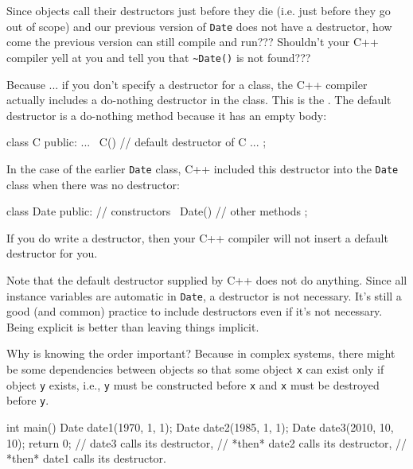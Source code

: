 \newpage{}

Since objects call their destructors just before they die (i.e. just
before they go out of scope) and our previous version of \texttt{Date}
does not have a destructor, how come the previous version can still
compile and run??? Shouldn't your C++ compiler yell at
you and tell you that \texttt{\~{}Date()} is not found???


Because ... if you don't specify a destructor for a
class, the C++ compiler actually includes a do-nothing destructor in the
class. This is the . The default destructor
is a do-nothing method because it has an empty body:

\begin{consolethree}[escapeinside=||]
class C
{
public:
    ...
    ~C() {} // default destructor of C
    ...
};
\end{consolethree}

In the case of the earlier \texttt{Date} class, C++ included this
destructor into the \texttt{Date} class when there was no destructor:

\begin{consolethree}[escapeinside=||]
class Date
{
public:
    // constructors
    ~Date() {}
    // other methods
};
\end{consolethree}

If you do write a destructor, then your C++ compiler will not insert a
default destructor for you.

Note that the default destructor supplied by C++ does not do anything.
Since all instance variables are automatic in \texttt{Date}, a destructor
is not necessary. It's still a good (and common)
practice to include destructors
even if it's not necessary. Being explicit is better
than leaving things implicit.


Why is knowing the order important? Because in complex systems, there
might be some dependencies between objects so that some object \texttt{x}
can exist only if object \texttt{y} exists, i.e., \texttt{y} must be
constructed before \texttt{x} and \texttt{x} must be destroyed before
\texttt{y}.

\begin{consolethree}[escapeinside=||]
int main()
{
    Date date1(1970, 1, 1);
    Date date2(1985, 1, 1);
    Date date3(2010, 10, 10);
    return 0; // date3 calls its destructor,
              // *then* date2 calls its destructor,
              // *then* date1 calls its destructor.
}
\end{consolethree}

